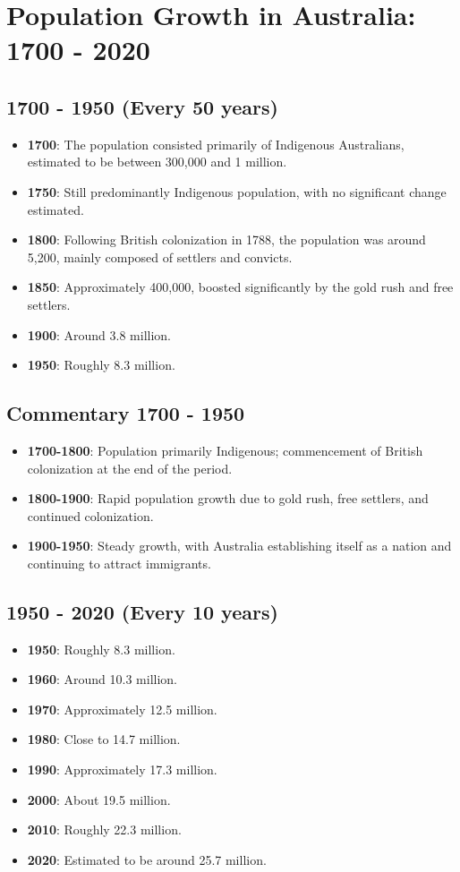 \section{Population Growth in Australia: 1700 - 2020}

\subsection*{1700 - 1950 (Every 50 years)}
\begin{itemize}
    \item \textbf{1700}: The population consisted primarily of Indigenous Australians, estimated to be between 300,000 and 1 million.
    \item \textbf{1750}: Still predominantly Indigenous population, with no significant change estimated.
    \item \textbf{1800}: Following British colonization in 1788, the population was around 5,200, mainly composed of settlers and convicts.
    \item \textbf{1850}: Approximately 400,000, boosted significantly by the gold rush and free settlers.
    \item \textbf{1900}: Around 3.8 million.
    \item \textbf{1950}: Roughly 8.3 million.
\end{itemize}

\subsection*{Commentary 1700 - 1950}
\begin{itemize}
    \item \textbf{1700-1800}: Population primarily Indigenous; commencement of British colonization at the end of the period.
    \item \textbf{1800-1900}: Rapid population growth due to gold rush, free settlers, and continued colonization.
    \item \textbf{1900-1950}: Steady growth, with Australia establishing itself as a nation and continuing to attract immigrants.
\end{itemize}

\subsection*{1950 - 2020 (Every 10 years)}
\begin{itemize}
    \item \textbf{1950}: Roughly 8.3 million.
    \item \textbf{1960}: Around 10.3 million.
    \item \textbf{1970}: Approximately 12.5 million.
    \item \textbf{1980}: Close to 14.7 million.
    \item \textbf{1990}: Approximately 17.3 million.
    \item \textbf{2000}: About 19.5 million.
    \item \textbf{2010}: Roughly 22.3 million.
    \item \textbf{2020}: Estimated to be around 25.7 million.
\end{itemize}

